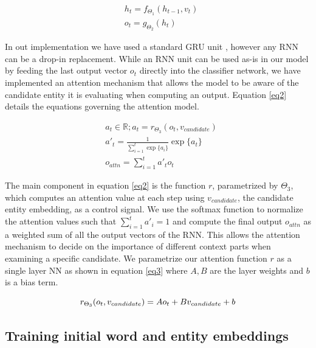 \documentclass[11pt]{article}
\begin{document}
	\begin{equation}
	\label{eq1}
	\begin{aligned}
	& h_t=f_{\Theta_1}(h_{t-1}, v_t) \\
	& o_t=g_{\Theta_2}(h_t)
	\end{aligned}
	\end{equation}

	In out implementation we have used a standard GRU unit \cite{cho2014learning}, however any RNN can be a drop-in replacement. While an RNN unit can be used as-is in our model by feeding the last output vector $o_t$ directly into the classifier network, we have implemented an attention mechanism that allows the model to be aware of the candidate entity it is evaluating when computing an output. Equation \ref{eq2} details the equations governing the attention model.
	
	\begin{equation}
	\label{eq2}
	\begin{aligned}
	& a_t \in \mathbb{R}; a_t=r_{\Theta_3}(o_t, v_{candidate}) \\
	& a'_t  = \frac{1}{\sum_{i=1}^{t} \exp\{a_i\}} \exp \{a_t\} \\
	& o_{attn}=\sum_{i=1}^{t} a'_t o_t
	\end{aligned}
	\end{equation}
	
	The main component in equation \ref{eq2} is the function $r$, parametrized by $\Theta_3$, which computes an attention value at each step using $v_{candidate}$, the candidate entity embedding, as a control signal. We use the softmax function to normalize the attention values such that $\sum_{i=1}^{t} a'_i = 1$ and compute the final output $o_{attn}$ as a weighted sum of all the output vectors of the RNN. This allows the attention mechanism to decide on the importance of different context parts when examining a specific candidate. We parametrize our attention function $r$ as a single layer NN as shown in equation \ref{eq3} where $A, B$ are the layer weights and $b$ is a bias term.
	
	\begin{equation}
	\label{eq3}
	r_{\Theta_3}(o_t, v_{candidate}) = Ao_t + Bv_{candidate} + b \\
	\end{equation}
	
	
	\subsection{Training initial word and entity embeddings}
	
\end{document}
